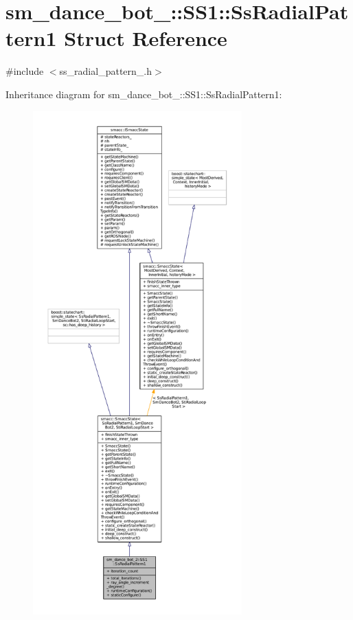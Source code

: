 \hypertarget{structsm__dance__bot__2_1_1SS1_1_1SsRadialPattern1}{}\section{sm\+\_\+dance\+\_\+bot\+\_\+:\+:S\+S1\+:\+:Ss\+Radial\+Pattern1 Struct Reference}
\label{structsm__dance__bot__2_1_1SS1_1_1SsRadialPattern1}


{\ttfamily \#include $<$ss\+\_\+radial\+\_\+pattern\+\_.\+h$>$}



Inheritance diagram for sm\+\_\+dance\+\_\+bot\+\_\+:\+:S\+S1\+:\+:Ss\+Radial\+Pattern1\+:
\nopagebreak
\begin{figure}[H]
\begin{center}
\leavevmode
\includegraphics[height=550pt]{structsm__dance__bot__2_1_1SS1_1_1SsRadialPattern1__inherit__graph}
\end{center}
\end{figure}


